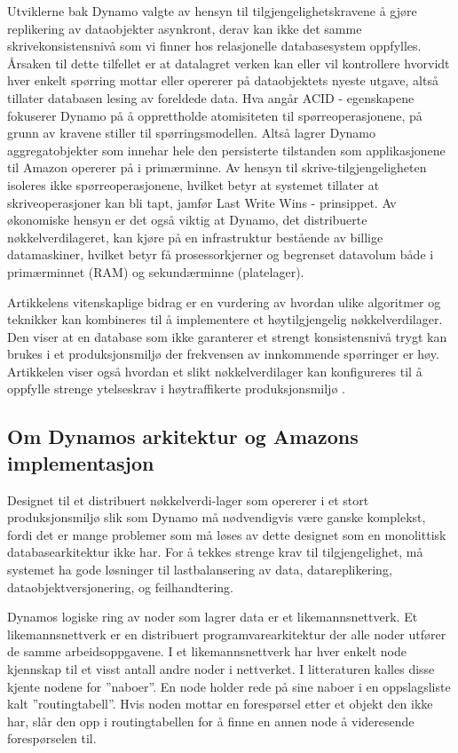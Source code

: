 Utviklerne bak Dynamo valgte av hensyn til tilgjengelighetskravene å gjøre replikering av dataobjekter asynkront, derav kan ikke det samme skrivekonsistensnivå som vi finner hos relasjonelle databasesystem oppfylles. Årsaken til dette tilfellet er at datalagret verken kan eller vil kontrollere hvorvidt hver enkelt spørring mottar eller opererer på dataobjektets nyeste utgave, altså tillater databasen lesing av foreldede data. Hva angår ACID - egenskapene fokuserer Dynamo på å opprettholde atomisiteten til spørreoperasjonene, på grunn av kravene \cite{decandia2007} stiller til spørringsmodellen. Altså lagrer Dynamo aggregatobjekter som innehar hele den persisterte tilstanden som applikasjonene til Amazon opererer på i primærminne. Av hensyn til skrive-tilgjengeligheten isoleres ikke spørreoperasjonene, hvilket betyr at systemet tillater at skriveoperasjoner kan bli tapt, jamfør Last Write Wins - prinsippet. Av økonomiske hensyn er det også viktig at Dynamo, det distribuerte nøkkelverdilageret, kan kjøre på en infrastruktur bestående av billige datamaskiner, hvilket betyr få prosessorkjerner og begrenset datavolum både i primærminnet (RAM) og sekundærminne (platelager).

Artikkelens vitenskaplige bidrag er en vurdering av hvordan ulike algoritmer og teknikker kan kombineres til å implementere et høytilgjengelig nøkkelverdilager. Den viser at en database som ikke garanterer et strengt konsistensnivå trygt kan brukes i et produksjonsmiljø der frekvensen av innkommende spørringer er høy. Artikkelen viser også hvordan et slikt nøkkelverdilager kan konfigureres til å oppfylle strenge ytelseskrav i høytraffikerte produksjonsmiljø \citep{decandia2007}.

\subsection{Om Dynamos arkitektur og Amazons implementasjon} \label{dynark}

Designet til et distribuert nøkkelverdi-lager som opererer i et stort produksjonsmiljø slik som Dynamo må nødvendigvis være ganske komplekst, fordi det er mange problemer som må løses av dette designet som en monolittisk databasearkitektur ikke har. For å tekkes strenge krav til tilgjengelighet, må systemet ha gode løsninger til lastbalansering av data, datareplikering, dataobjektversjonering, og feilhandtering.

Dynamos logiske ring av noder som lagrer data er et likemannsnettverk. Et likemannsnettverk er en distribuert programvarearkitektur der alle noder utfører de samme arbeidsoppgavene. I et likemannsnettverk har hver enkelt node kjennskap til et visst antall andre noder i nettverket. I litteraturen kalles disse kjente nodene for ''naboer''. En node holder rede på sine naboer i en oppslagsliste kalt ''routingtabell''. Hvis noden mottar en forespørsel etter et objekt den ikke har, slår den opp i routingtabellen for å finne en annen node å videresende forespørselen til.

